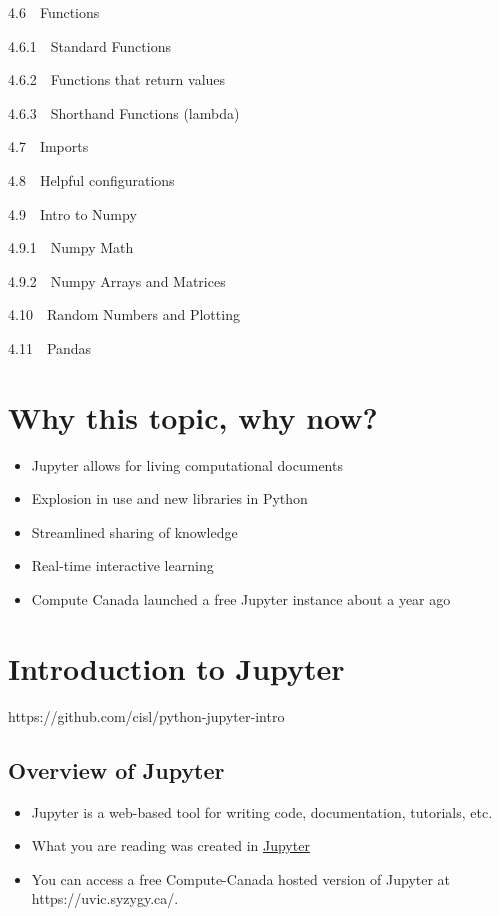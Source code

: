 \documentclass[11pt]{article}
\providecommand{\tightlist}{%
      \setlength{\itemsep}{0pt}\setlength{\parskip}{0pt}}
\begin{document}
{{4.6~~}Functions}

{{4.6.1~~}Standard Functions}

{{4.6.2~~}Functions that return values}

{{4.6.3~~}Shorthand Functions (lambda)}

{{4.7~~}Imports}

{{4.8~~}Helpful configurations}

{{4.9~~}Intro to Numpy}

{{4.9.1~~}Numpy Math}

{{4.9.2~~}Numpy Arrays and Matrices}

{{4.10~~}Random Numbers and Plotting}

{{4.11~~}Pandas}

    \section{Why this topic, why now?}\label{why-this-topic-why-now}

\begin{itemize}
\tightlist
\item
  Jupyter allows for living computational documents
\item
  Explosion in use and new libraries in Python
\item
  Streamlined sharing of knowledge
\item
  Real-time interactive learning
\item
  Compute Canada launched a free Jupyter instance about a year ago
\end{itemize}

    \section{Introduction to Jupyter}\label{introduction-to-jupyter}

    https://github.com/cisl/python-jupyter-intro

    \subsection{Overview of Jupyter}\label{overview-of-jupyter}

\begin{itemize}
\tightlist
\item
  Jupyter is a web-based tool for writing code, documentation,
  tutorials, etc.
\item
  What you are reading was created in
  \href{http://jupyter.org/}{Jupyter}
\item
  You can access a free Compute-Canada hosted version of Jupyter at
  https://uvic.syzygy.ca/.
\end{itemize}
\end{document}
